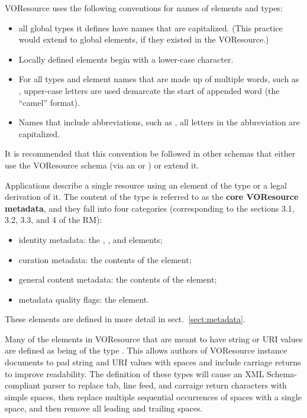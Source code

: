 \documentclass[11pt,a4paper]{ivoa}
\begin{document}

VOResource uses the following conventions for
names of elements and types:

\begin{itemize}
  \item all global types it defines have names that are capitalized.
       (This practice would extend to global elements, if they existed
       in the VOResource.)   
  \item Locally defined elements begin with a lower-case character. 
  \item For all types and element names that are made up of multiple
       words, such as , upper-case letters are
       used demarcate the start of appended word (the ``camel''
       format).  
  \item Names that include abbreviations, such as
       , all letters in the abbreviation are
       capitalized.  
\end{itemize}

It is recommended that this convention be followed in other schemas
that either use the VOResource schema (via an  or
) or extend it.  

Applications describe a single resource using an element of the type
 or a legal derivation of it.  The content of the
 type is referred to as the \textbf{core VOResource
metadata}, and they fall into four categories (corresponding to the
sections 3.1, 3.2, 3.3, and 4 of the RM):

\begin{itemize}
  \item identity metadata:  the ,
       , and
        elements;
  \item curation metadata:  the contents of the
        element;
  \item general content metadata:  the contents of the
        element;
  \item metadata quality flags:  the
        element.
\end{itemize}


These elements are defined in more detail in sect.~\ref{sect:metadata}.



Many of the elements in VOResource that are meant to have string or
URI values are defined as being of the type .
This allows authors of VOResource instance documents to pad string and
URI values with spaces and include carriage returns to improve
readability.  The definition of these types will cause an XML
Schema-compliant parser to replace tab, line feed, and carraige return
characters with simple spaces, then replace multiple sequential
occurrences of spaces with a single space, and then remove all leading
and trailing spaces.  
\end{document}
